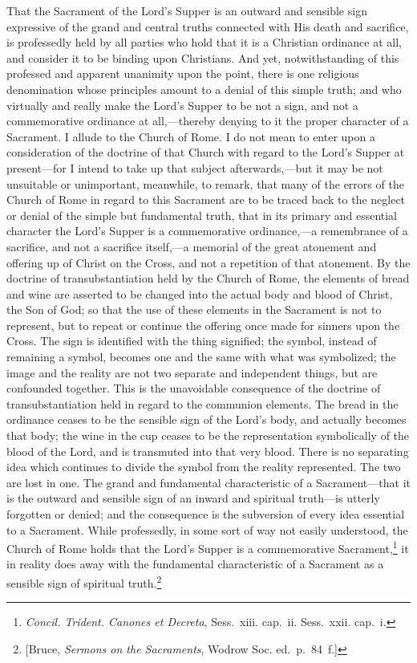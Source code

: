 \documentclass[
]{book}
\begin{document}
That the Sacrament of the Lord's Supper is an outward and sensible sign expressive of the grand and central truths connected with His death and sacrifice, is professedly held by all parties who hold that it is a Christian ordinance at all, and consider it to be binding upon Christians. And yet, notwithstanding of this professed and apparent unanimity upon the point, there is one religious denomination whose principles amount to a denial of this simple truth; and who virtually and really make the Lord's Supper to be not a sign, and not a commemorative ordinance at all,---thereby denying to it the proper character of a Sacrament. I allude to the Church of Rome. I do not mean to enter upon a consideration of the doctrine of that Church with regard to the Lord's Supper at present---for I intend to take up that subject afterwards,---but it may be not unsuitable or unimportant, meanwhile, to remark, that many of the errors of the Church of Rome in regard to this Sacrament are to be traced back to the neglect or denial of the simple but fundamental truth, that in its primary and essential character the Lord's Supper is a commemorative ordinance,---a remembrance of a sacrifice, and not a sacrifice itself,---a memorial of the great atonement and offering up of Christ on the Cross, and not a repetition of that atonement. By the doctrine of transubstantiation held by the Church of Rome, the elements of bread and wine are asserted to be changed into the actual body and blood of Christ, the Son of God; so that the use of these elements in the Sacrament is not to represent, but to repeat or continue the offering once made for sinners upon the Cross. The sign is identified with the thing signified; the symbol, instead of remaining a symbol, becomes one and the same with what was symbolized; the image and the reality are not two separate and independent things, but are confounded together. This is the unavoidable consequence of the doctrine of transubstantiation held in regard to the communion elements. The bread in the ordinance ceases to be the sensible sign of the Lord's body, and actually becomes that body; the wine in the cup ceases to be the representation symbolically of the blood of the Lord, and is transmuted into that very blood. There is no separating idea which continues to divide the symbol from the reality represented. The two are lost in one. The grand and fundamental characteristic of a Sacrament---that it is the outward and sensible sign of an inward and spiritual truth---is utterly forgotten or denied; and the consequence is the subversion of every idea essential to a Sacrament. While professedly, in some sort of way not easily understood, the Church of Rome holds that the Lord's Supper is a commemorative Sacrament,\footnote{\foreignlanguage{latin}{\emph{Concil. Trident. Canones et Decreta}}, Sess.~xiii. cap.~ii. Sess.~xxii. cap.~i.} it in reality does away with the fundamental characteristic of a Sacrament as a sensible sign of spiritual truth.\footnote{{[}Bruce, \emph{Sermons on the Sacraments}, Wodrow Soc. ed.~p.~84~f.{]}}
\end{document}
